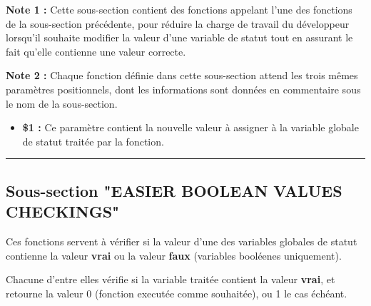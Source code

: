 \documentclass[a4paper,10pt]{article}
\begin{document}
\begin{justify}
    \textbf{Note 1 :} Cette sous-section contient des fonctions appelant l'une des fonctions de la sous-section précédente, pour réduire la charge de travail du développeur lorsqu'il souhaite modifier la valeur d'une variable de statut tout en assurant le fait qu'elle contienne une valeur correcte.
\end{justify}

\begin{justify}
    \textbf{Note 2 :} Chaque fonction définie dans cette sous-section attend les trois mêmes paramètres positionnels, dont les informations sont données en commentaire sous le nom de la sous-section.
\end{justify}

\begin{itemize}
    \item
    {
        \begin{justify}
            \textbf{\$1 :} Ce paramètre contient la nouvelle valeur à assigner à la variable globale de statut traitée par la fonction.
        \end{justify}


    }
\end{itemize}




\color{green}\par\noindent\rule{\textwidth}{0.4pt}\color{white}

\color{green}
\subsection{Sous-section "EASIER BOOLEAN VALUES CHECKINGS"}\color{white}

\begin{justify}
    Ces fonctions servent à vérifier si la valeur d'une des variables globales de statut contienne la valeur \textbf{vrai} ou la valeur \textbf{faux} (variables booléenes uniquement).
\end{justify}

\begin{justify}
    Chacune d'entre elles vérifie si la variable traitée contient la valeur \textbf{vrai}, et retourne la valeur 0 (fonction executée comme souhaitée), ou 1 le cas échéant.
\end{justify}
\end{document}
